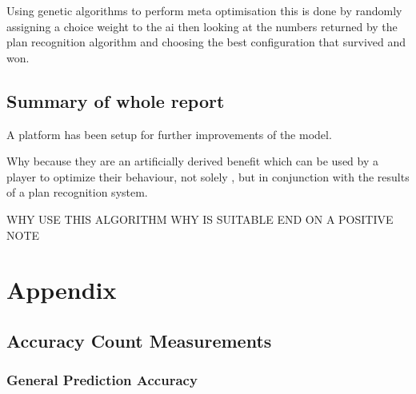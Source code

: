 \documentclass[parskip]{cs4rep}
\begin{document}
Using genetic algorithms to perform meta optimisation this is done by randomly assigning a choice weight to the ai then looking at the numbers returned by the plan recognition algorithm and choosing the best configuration that survived and won.

\section{Summary of whole report}

A platform has been setup for further improvements of the model.

Why because they are an artificially derived benefit which can be used by a player to optimize their behaviour, not solely , but in conjunction with the results of a plan recognition system.

WHY USE THIS ALGORITHM WHY IS SUITABLE END ON A POSITIVE NOTE

\chapter{Appendix}

\section{Accuracy Count Measurements}

\subsection{General Prediction Accuracy}
\end{document}

